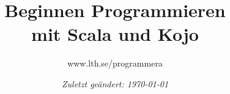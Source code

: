 \documentclass[12pt]{book}
\title{\fontsize{40}{40}\bf\sffamily\selectfont Beginnen Programmieren\\mit Scala und Kojo\vskip2cm  }
\author{\fontsize{18}{18}\selectfont www.lth.se/programmera}
\date{\fontsize{12}{12}\vskip3cm\it\selectfont Zuletzt geändert: \today{ }}
\begin{document}
\maketitle
\newpage
\thispagestyle{empty}



\newpage
\begin{multicols}{4}
\tableofcontents
\mainmatter
\end{multicols}

\fontsize{14}{16}\selectfont\raggedright


\end{document}
